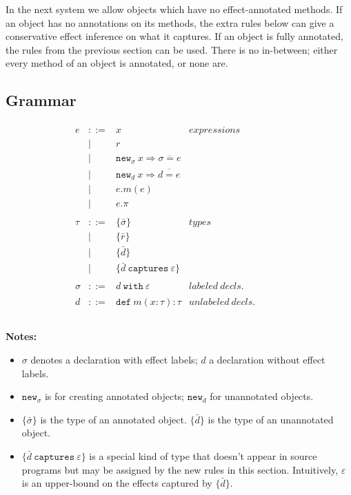 \documentclass{llncs}
\newcommand{\keywadj}[1]{\mathtt{#1}}
\newcommand{\keyw}[1]{\keywadj{#1}~}
\begin{document}
\noindent
In the next system we allow objects which have no effect-annotated methods. If an object has no annotations on its methods, the extra rules below can give a conservative effect inference on what it captures. If an object is fully annotated, the rules from the previous section can be used. There is no in-between; either every method of an object is annotated, or none are.

\subsection{Grammar}

\[
\begin{array}{lll}

\begin{array}{lllr}

e & ::= & x & expressions \\
  		& | & r \\
		& | & \keywadj{new}_\sigma~x \Rightarrow \overline{\sigma = e} \\
 		& | & \keywadj{new}_d~x \Rightarrow \overline{d = e} \\
 		& | & e.m(e)\\
 		& | & e.\pi\\
		&&\\

\tau & ::= & \{ \bar \sigma \} & types \\
		& | & \{ \bar r \} \\
		& | & \{ \bar d \} \\
		& | & \{ \bar d ~\keyw{captures} \varepsilon \} \\
		&&\\
		
\sigma & ::= & d~\keyw{with}\varepsilon  & labeled~ decls.\\
		&&\\

d & ::= & \keyw{def} m(x:\tau):\tau & unlabeled~decls.\\
		&&\\

\end{array}
& ~~~~~~
&
\end{array}
\]

\noindent \textbf{Notes:}
\begin{itemize}
	\item $\sigma$ denotes a declaration with effect labels; $d$ a declaration without effect labels.
	\item $\keywadj{new}_\sigma$ is for creating annotated objects; $\keywadj{new}_d$ for unannotated objects.
	\item $\{ \bar \sigma \}$ is the type of an annotated object. $\{ \bar d \}$ is the type of an unannotated object.
	\item $\{ \bar d ~\keyw{captures} \varepsilon \}$ is a special kind of type that doesn't appear in source programs but may be assigned by the new rules in this section. Intuitively, $\varepsilon$ is an upper-bound on the effects captured by $\{ \bar d \}$.
\end{itemize}
\end{document}
